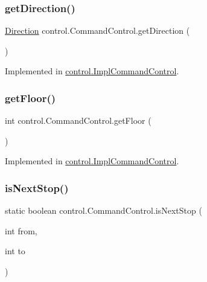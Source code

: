 \subsubsection{\texorpdfstring{getDirection()}{getDirection()}}
{\footnotesize\ttfamily \mbox{\hyperlink{enumcontrol_1_1command_1_1_direction}{Direction}} control.\+Command\+Control.\+get\+Direction (\begin{DoxyParamCaption}{ }\end{DoxyParamCaption})}



Implemented in \mbox{\hyperlink{classcontrol_1_1_impl_command_control_a9734880304099b72e4a65dbfe6a510a1}{control.\+Impl\+Command\+Control}}.

\mbox{\label{interfacecontrol_1_1_command_control_abfefcf986aceb87768275e04df3653f5}} 
\subsubsection{\texorpdfstring{getFloor()}{getFloor()}}
{\footnotesize\ttfamily int control.\+Command\+Control.\+get\+Floor (\begin{DoxyParamCaption}{ }\end{DoxyParamCaption})}



Implemented in \mbox{\hyperlink{classcontrol_1_1_impl_command_control_a03e231769f2023d9f381980a34057ad6}{control.\+Impl\+Command\+Control}}.

\mbox{\label{interfacecontrol_1_1_command_control_a4b2de21fece2328d079558688927fad2}} 
\subsubsection{\texorpdfstring{isNextStop()}{isNextStop()}}
{\footnotesize\ttfamily static boolean control.\+Command\+Control.\+is\+Next\+Stop (\begin{DoxyParamCaption}\item[{int}]{from,  }\item[{int}]{to }\end{DoxyParamCaption})\hspace{0.3cm}{\ttfamily [static]}}

